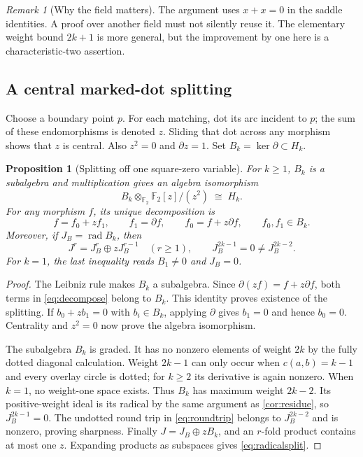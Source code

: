 \documentclass[11pt,letterpaper]{article}
\newtheorem{proposition}[theorem]{Proposition}
\theoremstyle{definition}
\theoremstyle{remark}
\newtheorem{remark}[theorem]{Remark}
\newcommand{\F}{\mathbb F_2}
\newcommand{\rad}{\operatorname{rad}}
\begin{document}
\begin{remark}[Why the field matters]
The argument uses $x+x=0$ in the saddle identities. A proof over another field
must not silently reuse it. The elementary weight bound $2k+1$ is more general,
but the improvement by one here is a characteristic-two assertion.
\end{remark}

\subsection{A central marked-dot splitting}
Choose a boundary point $p$. For each matching, dot its arc incident to $p$;
the sum of these endomorphisms is denoted $z$. Sliding that dot across any
morphism shows that $z$ is central. Also $z^2=0$ and $\partial z=1$.
Set $B_k=\ker\partial\subset H_k$.

\begin{proposition}[Splitting off one square-zero variable]\label{prop:split}
For $k\geq1$, $B_k$ is a subalgebra and multiplication gives an algebra
isomorphism
\begin{equation}\label{eq:split}
 B_k\otimes_{\F}\F[z]/(z^2)\;\cong\;H_k.
\end{equation}
For any morphism $f$, its unique decomposition is
\begin{equation}\label{eq:decompose}
 f=f_0+zf_1,\qquad f_1=\partial f,\qquad f_0=f+z\partial f,
 \qquad f_0,f_1\in B_k.
\end{equation}
Moreover, if $J_B=\rad B_k$, then
\begin{equation}\label{eq:radicalsplit}
 J^r=J_B^r\oplus zJ_B^{r-1}\quad(r\geq1),\qquad
 J_B^{2k-1}=0\ne J_B^{2k-2}.
\end{equation}
For $k=1$, the last inequality reads $B_1\ne0$ and $J_B=0$.
\end{proposition}
\begin{proof}
The Leibniz rule makes $B_k$ a subalgebra. Since
$\partial(zf)=f+z\partial f$, both terms in \cref{eq:decompose} belong to
$B_k$. This identity proves existence of the splitting. If $b_0+zb_1=0$ with
$b_i\in B_k$, applying $\partial$ gives $b_1=0$ and hence $b_0=0$.
Centrality and $z^2=0$ now prove the algebra isomorphism.

The subalgebra $B_k$ is graded. It has no nonzero elements of weight $2k$ by the
fully dotted diagonal calculation. Weight $2k-1$ can only occur when
$c(a,b)=k-1$ and every overlay circle is dotted; for $k\geq2$ its derivative
is again nonzero. When $k=1$, no weight-one space exists. Thus $B_k$ has
maximum weight $2k-2$. Its positive-weight ideal is its radical by the same
argument as \cref{cor:residue}, so $J_B^{2k-1}=0$. The undotted round trip
in \cref{eq:roundtrip} belongs to $J_B^{2k-2}$ and is nonzero, proving
sharpness. Finally $J=J_B\oplus zB_k$, and an $r$-fold product contains
at most one $z$. Expanding products as subspaces gives
\cref{eq:radicalsplit}.
\end{proof}
\end{document}
